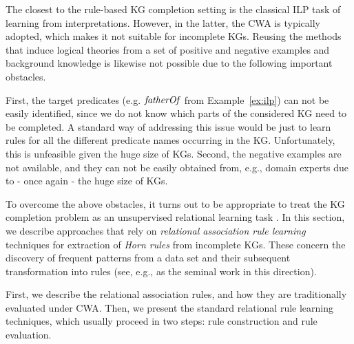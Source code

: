 The closest to the rule-based KG completion setting is the classical ILP task of learning from interpretations. However, in the latter, the CWA is typically adopted, which makes it not suitable for incomplete KGs. Reusing the methods that induce logical theories from a set of positive and negative examples and background knowledge is likewise not possible due to the following important obstacles. %

First, the target predicates (e.g. $\mathit{fatherOf}$ from Example~\ref{ex:ilp}) can
not be easily identified, since we do not know which parts of the considered KG need to
 be completed. A standard way of addressing this issue would be just to learn rules for all
 the different predicate names occurring in the KG. Unfortunately, this is unfeasible
 given the huge size of KGs. Second, the negative examples are not available,
 and they can not be easily obtained from, e.g., domain experts due to - once again
 - the huge size of KGs. %

To overcome the above obstacles, it turns out to be appropriate to treat the KG completion problem as an unsupervised relational learning task \cite{amie}.
In this section, we describe approaches that rely on \emph{relational association rule learning} techniques for extraction of \emph{Horn rules} from incomplete KGs. 
These concern the discovery of frequent patterns from a data set and their subsequent transformation into rules
(see, e.g., \cite{DBLP:conf/ilp/DehaspeR97} as the seminal work in this direction). %

First, we describe the relational association rules, and how they are traditionally evaluated under CWA. Then, we present the standard relational rule learning techniques, which usually proceed in two 
steps: rule construction and rule evaluation. %


